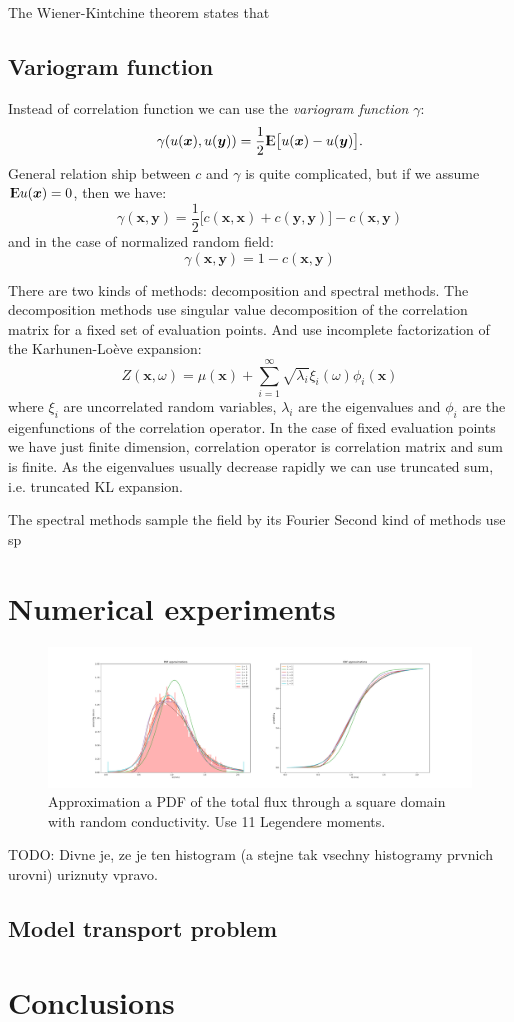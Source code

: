\documentclass{article}
\def\vc#1{\mathbf{\boldsymbol{#1}}}     %
\def \E{{{\rm I\kern-.3em E}}}
\def\todo#1{{\color{red}TODO: #1}}
\begin{document}
The Wiener-Kintchine theorem states that
\cite{}

\subsection{Variogram function}
Instead of correlation function we can use the \emph{variogram function} $\gamma$:
\[
    \gamma(u(\vc x), u(\vc y)) = \frac12 \E\big[u(\vc x) - u(\vc y)\big].
\]
General relation ship between $c$ and $\gamma$ is quite complicated, but if we assume $\E u(\vc x) = 0$, then
we have:
\[
    \gamma(\vc x, \vc y) = \frac12 \big[ c(\vc x, \vc x) + c(\vc y, \vc y)\big] - c(\vc x, \vc y)
\]
and in the case of normalized random field:
\[
    \gamma(\vc x, \vc y) = 1 - c(\vc x, \vc y)
\]


There are two kinds of methods: decomposition and spectral methods. The decomposition methods use singular value decomposition of the correlation matrix for a fixed set of evaluation points. And use incomplete factorization of the Karhunen-Lo\`eve expansion:
\[
    Z(\vc x, \omega) = \mu(\vc x) +  \sum_{i = 1}^\infty \sqrt{\lambda_i} \xi_i(\omega) \phi_i(\vc x)
\]
where  $\xi_i$ are uncorrelated random variables, $\lambda_i$ are the eigenvalues and  $\phi_i$ are 
the eigenfunctions of the correlation operator. In the case of fixed evaluation points we have just finite
dimension, correlation operator is correlation matrix and sum is finite. As the eigenvalues usually decrease
rapidly we can use truncated sum, i.e. truncated KL expansion.

The spectral methods sample the field by its Fourier Second kind of methods use sp

\section{Numerical experiments}
\begin{figure}
    \centering
    \includegraphics[width=\textwidth]{01_cond_pdf_cdf.pdf}
    \caption{Approximation a PDF of the total flux through a square domain with random conductivity. Use 11 Legendere moments.}
    \label{fig:flux_approx_pdf}
\end{figure}
\todo{Divne je, ze je ten histogram (a stejne tak vsechny histogramy prvnich urovni) uriznuty vpravo.}

\subsection{Model transport problem}
\section{Conclusions}





\end{document}
